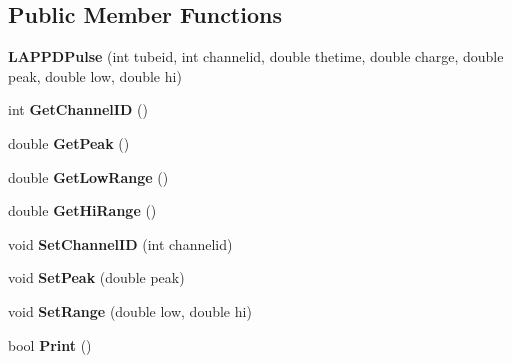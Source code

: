 \subsection*{Public Member Functions}
\begin{DoxyCompactItemize}
\item 
\hypertarget{classLAPPDPulse_ab6d60a683e420fd6304cc8d06b56e3f6}{
{\bfseries LAPPDPulse} (int tubeid, int channelid, double thetime, double charge, double peak, double low, double hi)}
\label{classLAPPDPulse_ab6d60a683e420fd6304cc8d06b56e3f6}

\item 
\hypertarget{classLAPPDPulse_af0a8fed16c7b5c00f8bb644fb5b5a862}{
int {\bfseries GetChannelID} ()}
\label{classLAPPDPulse_af0a8fed16c7b5c00f8bb644fb5b5a862}

\item 
\hypertarget{classLAPPDPulse_a86ef7d81b63accf60eea72dffd3c578d}{
double {\bfseries GetPeak} ()}
\label{classLAPPDPulse_a86ef7d81b63accf60eea72dffd3c578d}

\item 
\hypertarget{classLAPPDPulse_ac60601aee23092e71c13b953415d9d6d}{
double {\bfseries GetLowRange} ()}
\label{classLAPPDPulse_ac60601aee23092e71c13b953415d9d6d}

\item 
\hypertarget{classLAPPDPulse_a471f03a01ed49ef0db9438d13fe12200}{
double {\bfseries GetHiRange} ()}
\label{classLAPPDPulse_a471f03a01ed49ef0db9438d13fe12200}

\item 
\hypertarget{classLAPPDPulse_ae3dad03fc206ae35ad7799ffe892f949}{
void {\bfseries SetChannelID} (int channelid)}
\label{classLAPPDPulse_ae3dad03fc206ae35ad7799ffe892f949}

\item 
\hypertarget{classLAPPDPulse_a0c08b4bd1739552c7d6e2ad8cd9541e5}{
void {\bfseries SetPeak} (double peak)}
\label{classLAPPDPulse_a0c08b4bd1739552c7d6e2ad8cd9541e5}

\item 
\hypertarget{classLAPPDPulse_ae9345baa2efd05784e2b5c3c7023c194}{
void {\bfseries SetRange} (double low, double hi)}
\label{classLAPPDPulse_ae9345baa2efd05784e2b5c3c7023c194}

\item 
\hypertarget{classLAPPDPulse_a96fde20895fdcf61eb055308ed0b962d}{
bool {\bfseries Print} ()}
\label{classLAPPDPulse_a96fde20895fdcf61eb055308ed0b962d}

\end{DoxyCompactItemize}
